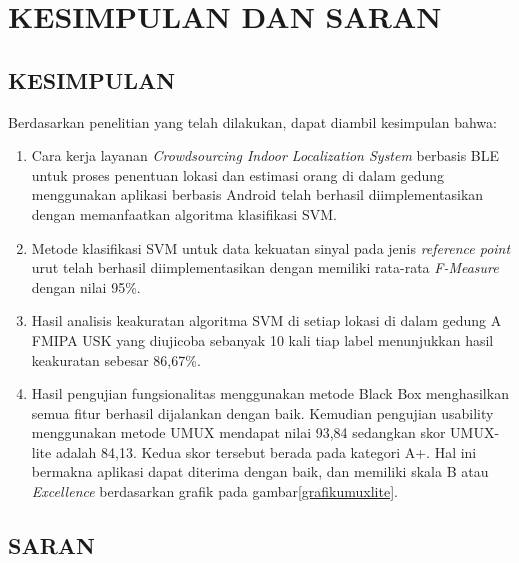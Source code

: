 \fancyhf{}
\fancyfoot[C]{\thepage}
\chapter{KESIMPULAN DAN SARAN}

\section{\uppercase{KESIMPULAN}}
Berdasarkan penelitian yang telah dilakukan, dapat diambil kesimpulan bahwa:
\begin{enumerate}
	\item Cara kerja layanan \textit{Crowdsourcing Indoor Localization System} berbasis BLE untuk proses penentuan lokasi dan estimasi orang di dalam gedung menggunakan aplikasi berbasis Android telah berhasil diimplementasikan dengan memanfaatkan algoritma klasifikasi SVM.
	\item Metode klasifikasi SVM untuk data kekuatan sinyal pada jenis \textit{reference point} urut telah berhasil diimplementasikan dengan memiliki rata-rata \textit{F-Measure} dengan nilai 95\%.
	\item Hasil analisis keakuratan algoritma SVM di setiap lokasi di dalam gedung A FMIPA USK yang diujicoba sebanyak 10 kali tiap label menunjukkan hasil keakuratan sebesar 86,67\%.
	\item Hasil pengujian fungsionalitas menggunakan metode Black Box menghasilkan semua fitur berhasil dijalankan dengan baik. Kemudian pengujian usability menggunakan metode UMUX mendapat nilai 93,84 sedangkan skor UMUX-lite adalah 84,13. Kedua skor tersebut berada pada kategori A+. Hal ini bermakna aplikasi dapat diterima dengan baik, dan memiliki skala B atau \textit{Excellence} berdasarkan grafik pada gambar\ref{grafikumuxlite}.
\end{enumerate}



\section{\uppercase{SARAN}}

